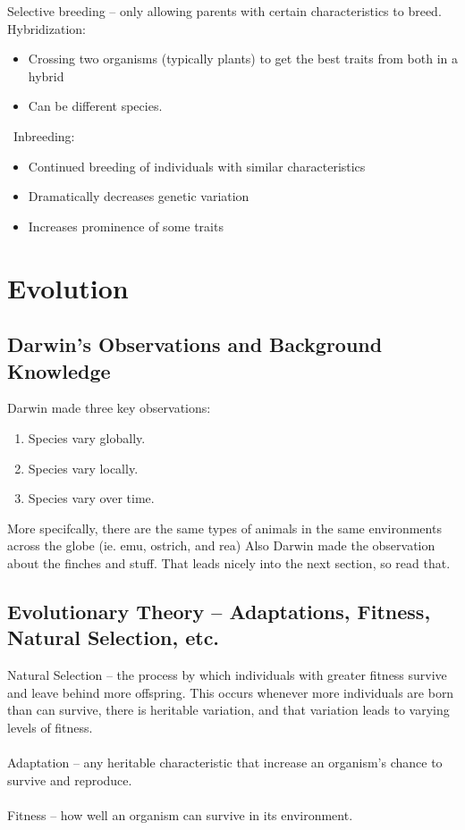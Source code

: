 \documentclass{article}
\begin{document}
Selective breeding -- only allowing parents with certain characteristics to breed.\\
Hybridization:
\begin{itemize}
\item Crossing two organisms (typically plants) to get the best traits from both in a hybrid
\item Can be different species.
\end{itemize}\
Inbreeding:
\begin{itemize}
\item Continued breeding of individuals with similar characteristics
\item Dramatically decreases genetic variation
\item Increases prominence of some traits
\end{itemize}

\section{Evolution} %

\subsection{Darwin's Observations and Background Knowledge}
Darwin made three key observations:
\begin{enumerate}
\item Species vary globally.
\item Species vary locally.
\item Species vary over time.
\end{enumerate}
More specifcally, there are the same types of animals in the same environments across the globe (ie. emu, ostrich, and rea)
Also Darwin made the observation about the finches and stuff.
That leads nicely into the next section, so read that.

\subsection{Evolutionary Theory -- Adaptations, Fitness, Natural Selection, etc.}
Natural Selection -- the process by which individuals with greater fitness survive and leave behind more offspring.
This occurs whenever more individuals are born than can survive, there is heritable variation, and that variation leads to varying levels of fitness.\\
\\
Adaptation -- any heritable characteristic that increase an organism's chance to survive and reproduce.\\
\\
Fitness -- how well an organism can survive in its environment.
\end{document}
